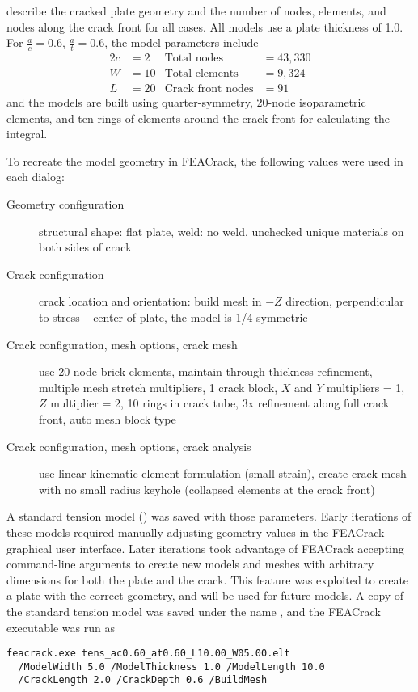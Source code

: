 \citeauthor[p.~178]{allenwells2014} describe the cracked plate geometry and the number of nodes, elements, and nodes along the crack front for all cases. All models use a plate thickness of 1.0.
For \(\frac{a}{c}=0.6\), \(\frac{a}{t}=0.6\), the model parameters include
\begin{align*}
2c &= 2 & \text{Total nodes} &= 43,330\\
W &= 10 & \text{Total elements} &= 9,324 \\
L &= 20 & \text{Crack front nodes} &= 91
\end{align*}
and the models are built using quarter-symmetry, 20-node isoparametric elements, and ten rings of elements around the crack front for calculating the \J integral.

To recreate the model geometry in FEACrack, the following values were used in each dialog:

\begin{description}
\item[Geometry configuration] structural shape: flat plate, weld: no weld, unchecked unique materials on both sides of crack
\item[Crack configuration] crack location and orientation: build mesh in \(-Z\) direction, perpendicular to stress -- center of plate, the model is 1/4 symmetric
\item[Crack configuration, mesh options, crack mesh] use 20-node brick elements, maintain through-thickness refinement, multiple mesh stretch multipliers, 1 crack block, \(X\) and \(Y\) multipliers = 1, \(Z\) multiplier = 2, 10 rings in crack tube, 3x refinement along full crack front, auto mesh block type
\item[Crack configuration, mesh options, crack analysis] use linear kinematic element formulation (small strain), create crack mesh with no small radius keyhole (collapsed elements at the crack front)
\end{description}

A standard tension model () was saved with those parameters.
Early iterations of these models required manually adjusting geometry values in the FEACrack graphical user interface.
Later iterations took advantage of FEACrack accepting command-line arguments to create new models and meshes with arbitrary dimensions for both the plate and the crack.
This feature was exploited to create a plate with the correct geometry, and will be used for future models.
A copy of the standard tension model was saved under the name , and the FEACrack executable was run as
\begin{Verbatim}[frame=single]
feacrack.exe tens_ac0.60_at0.60_L10.00_W05.00.elt
  /ModelWidth 5.0 /ModelThickness 1.0 /ModelLength 10.0
  /CrackLength 2.0 /CrackDepth 0.6 /BuildMesh
\end{Verbatim}

